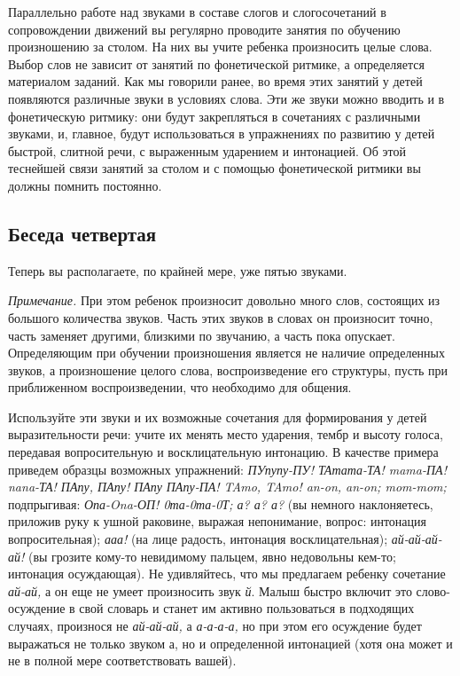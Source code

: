 \documentclass{book}
\renewcommand{\emph}[1]{\textit{#1}}
\begin{document}
Параллельно работе над звуками в составе слогов и слогосочетаний в
сопровождении движений вы регулярно проводите занятия по обучению
произношению за столом. На них вы учите ребенка произносить целые слова.
Выбор слов не зависит от занятий по фонетической ритмике, а определяется
материалом заданий. Как мы говорили ранее, во время этих занятий у детей
появляются различные звуки в условиях слова. Эти же звуки можно вводить
и в фонетическую ритмику: они будут закрепляться в сочетаниях с
различными звуками, и, главное, будут использоваться в упражнениях по
развитию у детей быстрой, слитной речи, с выраженным ударением и
интонацией. Об этой теснейшей связи занятий за столом и с помощью
фонетической ритмики вы должны помнить постоянно.

\subsection*{Беседа четвертая}

Теперь вы располагаете, по крайней мере, уже пятью звуками.

\emph{Примечание.} При этом ребенок произносит довольно много слов,
состоящих из большого количества звуков. Часть этих звуков в словах он
произносит точно, часть заменяет другими, близкими по звучанию, а часть
пока опускает. Определяющим при обучении произношения является не
наличие определенных звуков, а произношение целого слова,
воспроизведение его структуры, пусть при приближенном воспроизведении,
что необходимо для общения.

Используйте эти звуки и их возможные сочетания для формирования у детей
выразительности речи: учите их менять место ударения, тембр и высоту
голоса, передавая вопросительную и восклицательную интонацию. В качестве
примера приведем образцы возможных упражнений: \emph{ПУпупу-ПУ!
ТАтата-ТА! mama-ПА! nana-ТА! ПАпу, ПАпу! ПАпу} \emph{ПАпу-ПА! TAmo,
TAmo! an-on, an-on; mom-mom;} подпрыгивая: \emph{Опа-Ona-ОП! 0та-0та-0Т;
а? а? а?} (вы немного наклоняетесь, приложив руку к ушной раковине,
выражая непонимание, вопрос: интонация вопросительная); \emph{ааа!} (на
лице радость, интонация восклицательная); \emph{ай-ай-ай-ай!} (вы
грозите кому-то невидимому пальцем, явно недовольны кем-то; интонация
осуждающая). Не удивляйтесь, что мы предлагаем ребенку сочетание
\emph{ай-ай,} а он еще не умеет произносить звук \emph{й}. Малыш быстро
включит это слово-осуждение в свой словарь и станет им активно
пользоваться в подходящих случаях, произнося не \emph{ай-ай-ай,} а
\emph{а-а-а-а,} но при этом его осуждение будет выражаться не только
звуком а, но и определенной интонацией (хотя она может и не в полной
мере соответствовать вашей).
\end{document}
